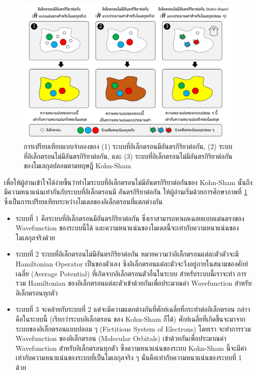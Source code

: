 \begin{figure}[H]
    \centering
    \includegraphics[width=\linewidth]{fig/electron_system.png}
    \caption{การเปรียบเทียบแบบจำลองของ (1) ระบบที่อิเล็กตรอนมีอันตรกิริยาต่อกัน, (2) ระบบที่อิเล็กตรอนไม่มีอันตรกิริยาต่อกัน, และ 
    (3) ระบบที่อิเล็กตรอนไม่มีอันตรกิริยาต่อกันของโมเลกุลปลอมตามทฤษฎี Kohn-Sham}
    \label{fig:electron_system}
\end{figure}

เพื่อให้ผู้อ่านเข้าใจได้ง่ายขึ้นว่าทำไมระบบที่อิเล็กตรอนไม่มีอันตรกิริยาต่อกันของ Kohn-Sham นั้นถึงมีความหนาแน่นเท่ากันกับระบบที่อิเล็กตรอนมี%
อันตรกิริยาต่อกัน ให้ผู้อ่านเริ่มด้วยการศึกษาภาพที่ \ref{fig:electron_system} ซึ่งเป็นการเปรียบเทียบระหว่างโมเดลของอิเล็กตรอนที่แตกต่างกัน

\begin{itemize}[topsep=0pt]
    \item ระบบที่ 1 คือระบบที่อิเล็กตรอนมีอันตรกิริยาต่อกัน ซึ่งเราสามารถหาผลเฉลยแบบแม่นตรงของ Wavefunction ของระบบนี้ได้ 
    และความหนาแน่นของโมเดลนี้จะเท่ากับความหนาแน่นของโมเลกุลจริงด้วย

    \item ระบบที่ 2 ระบบที่อิเล็กตรอนไม่มีอันตรกิริยาต่อกัน หมายความว่าอิเล็กตรอนแต่ละตัวตัวจะมี Hamiltonian Operator เป็นของตัวเอง 
    ซึงอิเล็กตรอนแต่ละตัวจะวิ่งอยู่ภายในสนามของศักย์เฉลี่ย (Average Potential) ที่เกิดจากอิเล็กตรอนตัวอื่นในระบบ สำหรับระบบนี้เราจะทำ%
    การรวม Hamiltonian ของอิเล็กตรอนแต่ละตัวเข้าด้วยกันเพื่อประมาณค่า Wavefunction สำหรับอิเล็กตรอนทุกตัว

    \item ระบบที่ 3 จะคล้ายกับระบบที่ 2 แต่จะมีความแตกต่างกันที่ศักย์เฉลี่ยที่กระทำต่ออิเล็กตรอน กล่าวคือในระบบนี้ (เรียกว่าระบบอิเล็กตรอน 
    ของ Kohn-Sham ก็ได้) ศักย์เฉลี่ยที่เกิดขึ้นจะมาจากระบบของอิเล็กตรอนแบบปลอม ๆ (Fictitious System of Electrons) โดยเรา%
    จะทำการรวม Wavefunction ของอิเล็กตรอน (Molecular Orbitals) เข้าด้วยกันเพื่อประมาณค่า Wavefunction สำหรับอิเล็กตรอนทุกตัว
    ซึ่งความหนาแน่นของระบบ Kohn-Sham นี้จะมีค่าเท่ากับความหนาแน่นของระบบที่เป็นโมเลกุลจริง ๆ นั่นคือเท่ากับความหนาแน่นของระบบที่ 1 
    ด้วย
\end{itemize}

